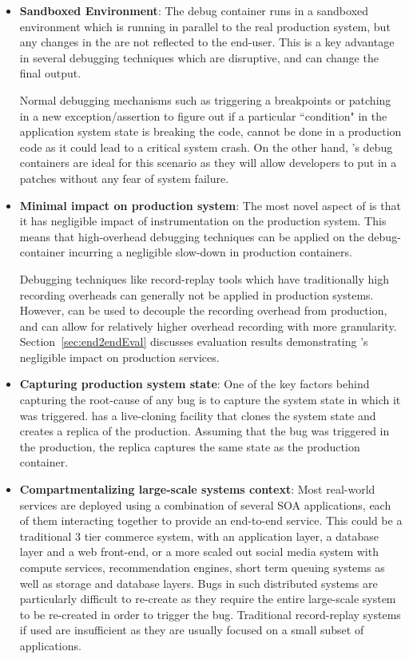 \begin{itemize}
	
	\item \textbf{Sandboxed Environment}: The debug container runs in a sandboxed environment which is running in parallel to the real production system, but any changes in the \debugcontainer are not reflected to the end-user. This is a key advantage in several debugging techniques which are disruptive, and can change the final output. 
	
	Normal debugging mechanisms such as triggering a breakpoints or patching in a new exception/assertion to figure out if a particular ``condition" in the application system state is breaking the code, cannot be done in a production code as it could lead to a critical system crash. On the other hand, \parikshan's debug containers are ideal for this scenario as they will allow developers to put in a patches without any fear of system failure.
	
	\item \textbf{Minimal impact on production system}: The most novel aspect of \parikshan is that it has negligible impact of instrumentation on the production system. 
	This means that high-overhead debugging techniques can be applied on the debug-container incurring a negligible slow-down in production containers.
	
	Debugging techniques like record-replay tools which have traditionally high recording overheads can generally not be applied in production systems. However, \parikshan can be used to decouple the recording overhead from production, and can allow for relatively higher overhead recording with more granularity.
	Section~\ref{sec:end2endEval} discusses evaluation results demonstrating \parikshan's negligible impact on production services.
	
	\item \textbf{Capturing production system state}:
	One of the key factors behind capturing the root-cause of any bug is to capture the system state in which it was triggered. \parikshan has a live-cloning facility that clones the system state and creates a replica of the production. Assuming that the bug was triggered in the production, the replica captures the same state as the production container.
	
	\item \textbf{Compartmentalizing large-scale systems context}:
	Most real-world services are deployed using a combination of several SOA applications, each of them interacting together to provide an end-to-end service. This could be a traditional 3 tier commerce system, with an application layer, a database layer and a web front-end, or a more scaled out social media system with compute services, recommendation engines, short term queuing systems as well as storage and database layers. 
	Bugs in such distributed systems are particularly difficult to re-create as they require the entire large-scale system to be re-created in order to trigger the bug. 
	Traditional record-replay systems if used are insufficient as they are usually focused on a small subset of applications.
	

\end{itemize}
